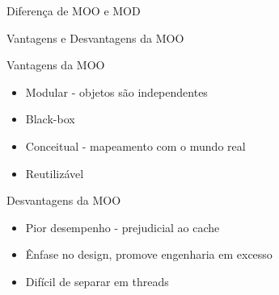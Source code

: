 \documentclass{beamer}
\begin{document}
\begin{frame}[t]{Diferença de MOO e MOD}
\begin{figure}
\begin{minipage}[b]{0.35\textwidth}
        \end{minipage}
    \end{figure}
\end{frame}

\begin{frame}[t]{Vantagens e Desvantagens da MOO}
    \begin{minipage}[b]{0.4\textwidth}
        Vantagens da MOO
        \begin{itemize}
            \item Modular - objetos são independentes
            \item Black-box
            \item Conceitual - mapeamento com o mundo real
            \item Reutilizável
        \end{itemize}
    \end{minipage}
    \hspace{1.5cm}
    \begin{minipage}[b]{0.4\textwidth}
        Desvantagens da MOO
        \begin{itemize}
            \item Pior desempenho - prejudicial ao cache
            \item Ênfase no design, promove engenharia em excesso
            \item Difícil de separar em threads
        \end{itemize}
    \end{minipage}
\end{frame}
\end{document}
